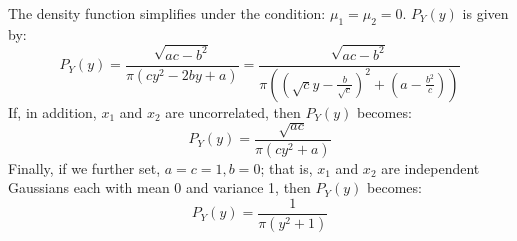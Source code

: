 The density function simplifies under the condition: 
$\mu_1 = \mu_2 = 0$. $P_Y(y)$ is given by:
$$
P_Y(y) = \frac{\sqrt{ac - b^2}}{\pi (cy^2 - 2by + a)} 
= \frac{\sqrt{ac - b^2}}{\pi \left( (\sqrt{c}y -
\frac{b}{\sqrt{c}})^2 + (a - \frac{b^2}{c})\right)} 
$$
If, in addition, $x_1$ and $x_2$ are uncorrelated, then $P_Y(y)$
becomes:
$$
P_Y(y) = \frac{\sqrt{ac}}{\pi (cy^2 + a)}
$$
Finally, if we further set, $a = c = 1, b = 0$; that is, $x_1$ and $x_2$
are independent
Gaussians each with mean 0 and variance 1, then $P_Y(y)$ becomes:
$$
P_Y(y) = \frac{1}{\pi (y^2 + 1)}
$$

\bye


